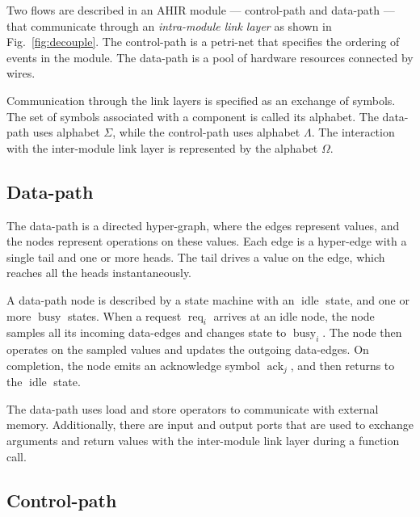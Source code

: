 \documentclass[conference]{IEEEtran}
\newcommand{\sym}[1]{$\operatorname{#1}$}
\begin{document}
Two flows are described in an AHIR module --- control-path and
data-path --- that communicate through an \emph{intra-module link
  layer} as shown in Fig.~\ref{fig:decouple}. The control-path is a
petri-net that specifies the ordering of events in the module. The
data-path is a pool of hardware resources connected by wires.

Communication through the link layers is specified as an exchange of
symbols. The set of symbols associated with a component is called its
alphabet. The data-path uses alphabet $\Sigma$, while the control-path
uses alphabet $\Lambda$. The interaction with the inter-module link
layer is represented by the alphabet $\Omega$.

\subsection{Data-path}

The data-path is a directed hyper-graph, where the edges represent
values, and the nodes represent operations on these values. Each edge
is a hyper-edge with a single tail and one or more heads. The tail
drives a value on the edge, which reaches all the heads
instantaneously.

A data-path node is described by a state machine with an \sym{idle}
state, and one or more \sym{busy} states. When a request
$\operatorname{req}_i$ arrives at an idle node, the node samples all
its incoming data-edges and changes state to $\operatorname{busy}_i$.
The node then operates on the sampled values and updates the outgoing
data-edges. On completion, the node emits an acknowledge symbol
$\operatorname{ack}_j$, and then returns to the \sym{idle} state.

The data-path uses load and store operators to communicate with
external memory. Additionally, there are input and output ports that
are used to exchange arguments and return values with the inter-module
link layer during a function call.

\subsection{Control-path}

\end{document}
